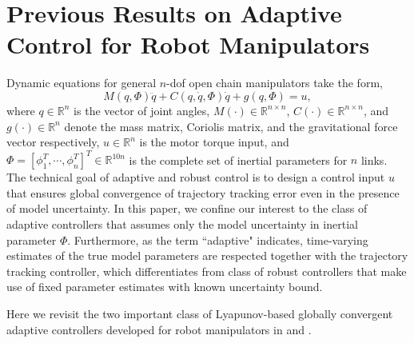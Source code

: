 \documentclass[letterpaper, 10 pt, conference]{ieeeconf}  %
\begin{document}
\section{Previous Results on Adaptive Control for Robot Manipulators}
Dynamic equations for general $n$-dof open chain manipulators take the form,
\begin{equation}
M(q,\Phi)\ddot{q}+C(q,\dot{q},\Phi)\dot{q} + g(q,\Phi) = u, \label{dynamics}
\end{equation}
where $q\in\mathbb{R}^n$ is the vector of joint angles, $M(\cdot)\in\mathbb{R}^{n\times n}$, $C(\cdot)\in\mathbb{R}^{n\times n}$, and $g(\cdot)\in\mathbb{R}^{n}$ denote the mass matrix, Coriolis matrix, and the gravitational force vector respectively, $u\in\mathbb{R}^{n}$ is the motor torque input, and $\Phi = [\phi_{1}^{T}, \cdots, \phi_{n}^{T}]^{T}\in\mathbb{R}^{10n}$ is the complete set of inertial parameters for $n$ links. The technical goal of adaptive and robust control is to design a control input $u$ that ensures global convergence of trajectory tracking error even in the presence of model uncertainty. In this paper, we confine our interest to the class of adaptive controllers that assumes only the model uncertainty in inertial parameter $\Phi$. Furthermore, as the term ``adaptive"  indicates, time-varying estimates of the true model parameters are respected together with the trajectory tracking controller, which differentiates from class of robust controllers that make use of fixed parameter estimates with known uncertainty bound.

Here we revisit the two important class of Lyapunov-based globally convergent adaptive controllers developed for robot manipulators in \cite{Craig_AdaptiveControl} and \cite{Slotine_AdaptiveControl}.
\end{document}
